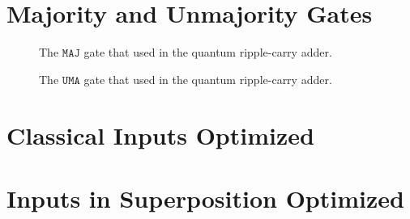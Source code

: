 \begin{appendices}
\section{Majority and Unmajority Gates}
\label{appendix:majGates}
\begin{figure}[htp]
    \centering     
    \begin{minipage}{.45\textwidth}
        
        \caption{The $\texttt{MAJ}$ gate that used in the quantum ripple-carry adder.}
        \label{fig:eval_majorityGate}
    \end{minipage}
    \hfill
    \begin{minipage}{.45\textwidth}
        
        \caption{The $\texttt{UMA}$ gate that used in the quantum ripple-carry adder.}    
        \label{fig:eval_unmajorityGate}
    \end{minipage}
\end{figure}

\section{Classical Inputs Optimized}
\label{appendix:classicalInputs_optimized}


\newpage
\section{Inputs in Superposition Optimized}
\label{appendix:superposInputs_optimized}






\end{appendices}